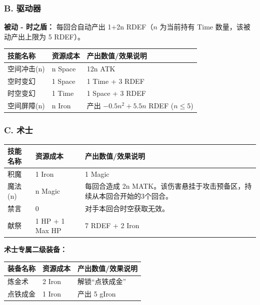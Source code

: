 \documentclass[a4paper,10pt]{ctexart}
\begin{document}
\subsubsection*{B. 驱动器}
\textbf{被动 - 时之盾：} 每回合自动产出 1+2n RDEF（$n$ 为当前持有 Time 数量，该被动产出上限为 5 RDEF）。
\begin{table}[h]
\centering
\begin{tabular}{lll}
\toprule
技能名称 & 资源成本 & 产出数值/效果说明 \\
\midrule
空间冲击(n) & n Space & 12n ATK \\
空时变幻 & 1 Space & 1 Time + 3 RDEF \\
时空变幻 & 1 Time & 1 Space + 3 RDEF \\
空间屏障(n) & n Iron & 产出 $-0.5n^2 + 5.5n$ RDEF ($n \le 5$) \\
\bottomrule
\end{tabular}
\end{table}

\subsubsection*{C. 术士}
\begin{table}[h]
\centering
\begin{tabularx}{\textwidth}{llX}
\toprule
技能名称 & 资源成本 & 产出数值/效果说明 \\
\midrule
积魔 & 1 Iron & 1 Magic \\
魔法(n) & n Magic & 每回合造成 2n MATK。该伤害悬挂于攻击预备区，持续从本回合开始的3个回合。 \\
禁言 & 0 & 对手本回合时空获取无效。 \\
献祭 & 1 HP + 1 Max HP & 7 RDEF + 2 Iron \\
\bottomrule
\end{tabularx}
\end{table}

\textbf{术士专属二级装备：}
\begin{table}[h]
\centering
\begin{tabular}{lll}
\toprule
装备名称 & 资源成本 & 产出数值/效果说明 \\
\midrule
炼金术 & 2 Iron & 解锁“点铁成金” \\
点铁成金 & 1 Iron & 产出 5 gIron \\
\bottomrule
\end{tabular}
\end{table}
\end{document}
